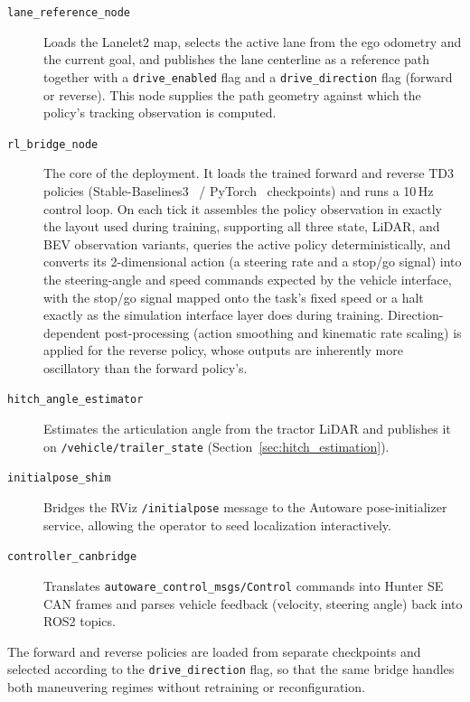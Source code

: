\begin{description}
    \item[\texttt{lane\_reference\_node}] Loads the Lanelet2 map, selects the active lane from the ego odometry and the current goal, and publishes the lane centerline as a reference path together with a \texttt{drive\_enabled} flag and a \texttt{drive\_direction} flag (forward or reverse). This node supplies the path geometry against which the policy's tracking observation is computed.

    \item[\texttt{rl\_bridge\_node}] The core of the deployment. It loads the trained forward and reverse TD3 policies (Stable-Baselines3~\cite{raffin2021sb3} / PyTorch~\cite{paszke2019pytorch} checkpoints) and runs a 10\,Hz control loop. On each tick it assembles the policy observation in exactly the layout used during training, supporting all three state, LiDAR, and BEV observation variants, queries the active policy deterministically, and converts its 2-dimensional action (a steering rate and a stop/go signal) into the steering-angle and speed commands expected by the vehicle interface, with the stop/go signal mapped onto the task's fixed speed or a halt exactly as the simulation interface layer does during training. Direction-dependent post-processing (action smoothing and kinematic rate scaling) is applied for the reverse policy, whose outputs are inherently more oscillatory than the forward policy's.

    \item[\texttt{hitch\_angle\_estimator}] Estimates the articulation angle from the tractor LiDAR and publishes it on \texttt{/vehicle/trailer\_state} (Section~\ref{sec:hitch_estimation}).

    \item[\texttt{initialpose\_shim}] Bridges the RViz \texttt{/initialpose} message to the Autoware pose-initializer service, allowing the operator to seed localization interactively.

    \item[\texttt{controller\_canbridge}] Translates \texttt{autoware\_\allowbreak control\_\allowbreak msgs/\allowbreak Control} commands into Hunter SE CAN frames and parses vehicle feedback (velocity, steering angle) back into ROS2 topics.
\end{description}

The forward and reverse policies are loaded from separate checkpoints and selected according to the \texttt{drive\_direction} flag, so that the same bridge handles both maneuvering regimes without retraining or reconfiguration.

